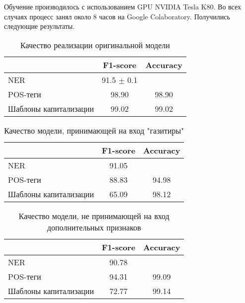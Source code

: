 \documentclass[a4paper,14pt]{extarticle}
\begin{document}
Обучение производилось с использованием GPU NVIDIA Tesla K80. Во всех случаях процесс занял около 8 часов на Google Colaboratory. Получились следующие результаты.

\begin{table}[H]
    \caption{Качество реализации оригинальной модели}
    \label{progress}
    \begin{center}
    \begin{tabular}{l|c|c}
                              & F1-score         & Accuracy \\
        \hline
        NER                   & 91.5 $\pm$ 0.1   &          \\
        POS-теги              & 98.90            & 98.90    \\
        Шаблоны капитализации & 99.02            & 99.02    \\
    \end{tabular}
    \end{center}
\end{table}

\begin{table}[H]
    \caption{Качество модели, принимающей на вход "газитиры"}
    \label{progress}
    \begin{center}
    \begin{tabular}{l|c|c}
                              & F1-score & Accuracy \\
        \hline
        NER                   & 91.05    &          \\
        POS-теги              & 88.83    & 94.98    \\
        Шаблоны капитализации & 65.09    & 98.12    \\
    \end{tabular}
    \end{center}
\end{table}

\begin{table}[H]
    \caption{Качество модели, не принимающей на вход дополнительных признаков}
    \label{progress}
    \begin{center}
    \begin{tabular}{l|c|c}
                              & F1-score & Accuracy \\
        \hline
        NER                   & 90.78    &          \\
        POS-теги              & 94.31    & 99.09    \\
        Шаблоны капитализации & 72.77    & 99.14    \\
    \end{tabular}
    \end{center}
\end{table}
\end{document}
